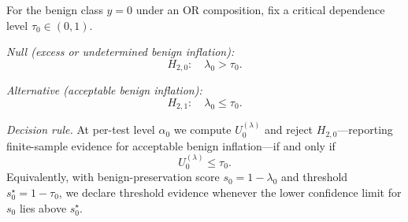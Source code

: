 \begin{hypothesis}
\label{hyp:H2-final}
For the benign class $y=0$ under an OR composition, fix a critical
dependence level $\tau_0 \in (0,1)$.

\emph{Null (excess or undetermined benign inflation):}
\[
  H_{2,0}:\quad \lambda_0 > \tau_0.
\]

\emph{Alternative (acceptable benign inflation):}
\[
  H_{2,1}:\quad \lambda_0 \le \tau_0.
\]

\emph{Decision rule.}
At per-test level $\alpha_0$ we compute $U^{(\lambda)}_0$ and reject
$H_{2,0}$---reporting finite-sample evidence for acceptable benign inflation---if and
only if
\begin{equation}
  U^{(\lambda)}_0 \le \tau_0.
  \label{eq:H2-rule-final}
\end{equation}
Equivalently, with benign-preservation score $s_0=1-\lambda_0$ and
threshold $s_0^\star = 1-\tau_0$, we declare threshold evidence whenever the lower
confidence limit for $s_0$ lies above $s_0^\star$.
\end{hypothesis}
